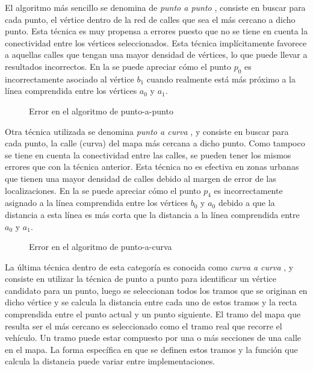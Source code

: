 El algoritmo más sencillo se denomina de \emph{punto a punto} \cite{white2000some}, consiste en buscar para cada punto, el vértice dentro de la red de calles que sea el más cercano a dicho punto. Esta técnica es muy propensa a errores puesto que no se tiene en cuenta la conectividad entre los vértices seleccionados. Esta técnica implícitamente favorece a aquellas calles que tengan una mayor densidad de vértices, lo que puede llevar a resultados incorrectos. En la  se puede apreciar cómo el punto $p_0$ es incorrectamente asociado al vértice $b_1$ cuando realmente está más próximo a la línea comprendida entre los vértices $a_0$ y $a_1$.

\begin{figure}[h]
	\centering
	
	\caption{Error en el algoritmo de punto-a-punto}
	\label{fig:punto-a-punto} 
\end{figure}

Otra técnica utilizada se denomina \emph{punto a curva} \cite{white2000some}, y consiste en buscar para cada punto, la calle (curva) del mapa más cercana a dicho punto. Como tampoco se tiene en cuenta la conectividad entre las calles, se pueden tener los mismos errores que con la técnica anterior. Esta técnica no es efectiva en zonas urbanas que tienen una mayor densidad de calles debido al margen de error de las localizaciones. En la  se puede apreciar cómo el punto $p_4$ es incorrectamente asignado a la línea comprendida entre los vértices $b_0$ y $a_0$ debido a que la distancia a esta línea es más corta que la distancia a la línea comprendida entre $a_0$ y $a_1$.

\begin{figure}[h]
	\centering
	
	\caption{Error en el algoritmo de punto-a-curva}
	\label{fig:punto-a-curva} 
\end{figure}

La última técnica dentro de esta categoría es conocida como \emph{curva a curva} \cite{white2000some}, y consiste en  utilizar la técnica de punto a punto para identificar un vértice candidato para un punto, luego se seleccionan todos los tramos que se originan en dicho vértice y se calcula la distancia entre cada uno de estos tramos y la recta comprendida entre el punto actual y un punto siguiente. El tramo del mapa que resulta ser el más cercano es seleccionado como el tramo real que recorre el vehículo. Un tramo puede estar compuesto por una o más secciones de una calle en el mapa. La forma específica en que se definen estos tramos y la función que calcula la distancia puede variar entre implementaciones.

